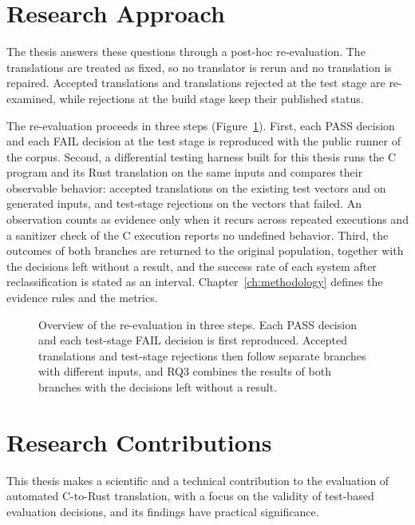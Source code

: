 \section{Research Approach}\label{sec:intro-approach}

The thesis answers these questions through a post-hoc re-evaluation. The translations are treated as fixed, so no translator is rerun and no translation is repaired. Accepted translations and translations rejected at the test stage are re-examined, while rejections at the build stage keep their published status.

The re-evaluation proceeds in three steps (Figure~\ref{fig:intro-pipeline}). First, each PASS decision and each FAIL decision at the test stage is reproduced with the public runner of the corpus. Second, a differential testing harness built for this thesis runs the C program and its Rust translation on the same inputs and compares their observable behavior: accepted translations on the existing test vectors and on generated inputs, and test-stage rejections on the vectors that failed. An observation counts as evidence only when it recurs across repeated executions and a sanitizer check of the C execution reports no undefined behavior. Third, the outcomes of both branches are returned to the original population, together with the decisions left without a result, and the success rate of each system after reclassification is stated as an interval. Chapter~\ref{ch:methodology} defines the evidence rules and the metrics.

\begin{figure}[!htbp]
\centering
\resizebox{\linewidth}{!}{}
\caption{Overview of the re-evaluation in three steps. Each PASS decision and each test-stage FAIL decision is first reproduced. Accepted translations and test-stage rejections then follow separate branches with different inputs, and RQ3 combines the results of both branches with the decisions left without a result.}
\label{fig:intro-pipeline}
\end{figure}

\section{Research Contributions}\label{sec:intro-contributions}

This thesis makes a scientific and a technical contribution to the evaluation of automated C-to-Rust translation, with a focus on the validity of test-based evaluation decisions, and its findings have practical significance.

